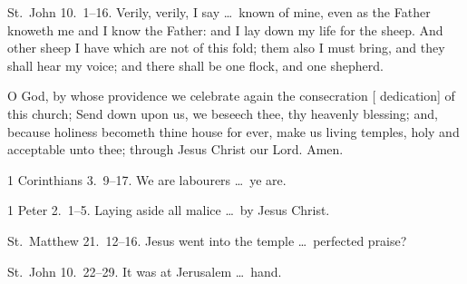  St.~John 10.~1–16.   Verily, verily, I say \ldots\ known of mine, even as the Father knoweth me and I know the Father: and I lay down my life for the sheep. And other sheep I have which are not of this fold; them also I must bring, and they shall hear my voice; and there shall be one flock, and one shepherd.

\medskip


{\par}\par


 O God, by whose providence we celebrate again the consecration [ dedication] of this church; Send down upon us, we beseech thee, thy heavenly blessing; and, because holiness becometh thine house for ever, make us living temples, holy and acceptable unto thee; through Jesus Christ our Lord. \R Amen.

 1 Corinthians 3.~9–17.   We are labourers \ldots\ ye are.

 1 Peter 2.~1–5.   Laying aside all malice \ldots\ by Jesus Christ.

 St.~Matthew 21.~12–16.   Jesus went into the temple \ldots\ perfected praise?

 St.~John 10.~22–29. It was at Jerusalem \ldots\ hand.


\medskip



\medskip



